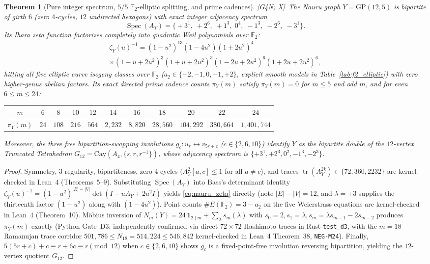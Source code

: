 \documentclass[11pt]{amsart}
\numberwithin{equation}{section}
\theoremstyle{plain}
\newtheorem{theorem}{Theorem}[section]
\theoremstyle{definition}\newtheorem{definition}[theorem]{Definition}
\theoremstyle{remark}\newtheorem{remark}[theorem]{Remark}
\newcommand{\F}{\mathbb{F}}
\newcommand{\Cay}{\mathrm{Cay}}
\newcommand{\GP}{\mathrm{GP}}
\newcommand{\ctag}[1]{\textup{\textsf{\scriptsize[#1]}}}
\begin{document}
\begin{theorem}[Pure integer spectrum, $5/5$ $\F_2$-elliptic splitting, and prime cadences]\label{thm:nauru_weil}
\ctag{G4N; X}\ The Nauru graph $Y=\GP(12,5)$ is bipartite of girth $6$ (zero $4$-cycles, $12$ undirected hexagons) with exact integer adjacency spectrum
\[
\operatorname{Spec}(A_Y) = \bigl\{+3^1,\; +2^6,\; +1^3,\; 0^4,\; -1^3,\; -2^6,\; -3^1\bigr\}.
\]
Its Ihara zeta function factorizes completely into quadratic Weil polynomials over $\F_2$:
\begin{multline}\label{eq:nauru_zeta}
\zeta_Y(u)^{-1} = (1-u^2)^{13}(1-4u^2)(1+2u^2)^4\\
\times (1-u+2u^2)^3(1+u+2u^2)^3(1-2u+2u^2)^6(1+2u+2u^2)^6,
\end{multline}
hitting \emph{all five} elliptic curve isogeny classes over $\F_2$ ($a_2\in\{-2,-1,0,+1,+2\}$, explicit smooth models in Table~\ref{tab:f2_elliptic}) with zero higher-genus abelian factors. Its exact directed prime cadence counts $\pi_Y(m)$ satisfy $\pi_Y(m)=0$ for $m\le 5$ and odd $m$, and for even $6\le m\le 24$:
\begin{center}\footnotesize\setlength{\tabcolsep}{3.5pt}
\begin{tabular}{c|cccccccccc}\toprule
$m$ & $6$ & $8$ & $10$ & $12$ & $14$ & $16$ & $18$ & $20$ & $22$ & $24$ \\\midrule
$\pi_Y(m)$ & $24$ & $108$ & $216$ & $564$ & $2{,}232$ & $8{,}820$ & $28{,}560$ & $104{,}292$ & $380{,}664$ & $1{,}401{,}744$ \\\bottomrule
\end{tabular}
\end{center}
Moreover, the three free bipartition-swapping involutions $g_c:u_r\leftrightarrow v_{5r+c}$ ($c\in\{2,6,10\}$) identify $Y$ as the bipartite double of the $12$-vertex \emph{Truncated Tetrahedron} $G_{12}=\Cay(A_4,\{s,r,r^{-1}\})$, whose adjacency spectrum is $\{+3^1,+2^3,0^2,-1^3,-2^3\}$.
\end{theorem}
\begin{proof}
Symmetry, $3$-regularity, bipartiteness, zero $4$-cycles ($A_Y^2[a,c]\le 1$ for all $a\ne c$), and traces $\operatorname{tr}(A_Y^{2k})\in\{72,360,2232\}$ are kernel-checked in Lean~4 (Theorems~5--9). Substituting $\operatorname{Spec}(A_Y)$ into Bass's determinant identity $\zeta_Y(u)^{-1}=(1-u^2)^{|E|-|V|}\det(I-uA_Y+2u^2 I)$ yields \eqref{eq:nauru_zeta} directly (note $|E|-|V|=12$, and $\lambda=\pm 3$ supplies the thirteenth factor $(1-u^2)$ along with $(1-4u^2)$). Point counts $\#E(\F_2)=3-a_2$ on the five Weierstrass equations are kernel-checked in Lean~4 (Theorem~10). M\"obius inversion of $N_m(Y)=24\,\mathbf{1}_{2\mid m}+\sum_\lambda s_m(\lambda)$ with $s_0=2,s_1=\lambda,s_m=\lambda s_{m-1}-2s_{m-2}$ produces $\pi_Y(m)$ exactly (Python Gate~D3; independently confirmed via direct $72\times 72$ Hashimoto traces in Rust \texttt{test\_d3}, with the $m=18$ Ramanujan trace corridor $501{,}786\le N_{18}=514{,}224\le 546{,}842$ kernel-checked in Lean~4 Theorem~38, \texttt{NEG-M24}). Finally, $5(5r+c)+c\equiv r+6c\equiv r\pmod{12}$ when $c\in\{2,6,10\}$ shows $g_c$ is a fixed-point-free involution reversing bipartition, yielding the $12$-vertex quotient $G_{12}$.
\end{proof}
\end{document}
